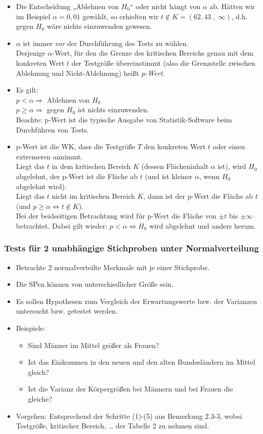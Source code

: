 \documentclass{scrreprt}
\begin{document}
\begin{itemize}
\item Die Entscheidung „Ablehnen von $H_0$“ oder nicht hängt von $\alpha$ ab. Hätten wir im Beispiel $\alpha = 0,01$ gewählt, so erhielten wir $t \not \in K = (62,43 \;,\; \infty)$, d.h. gegen $H_0$ wäre nichts einzuwenden gewesen.
\item $\alpha$ ist immer \emph{vor} der Durchführung des Tests zu wählen.\\
Derjenige $\alpha$-Wert, für den die Grenze des kritischen Bereichs genau mit dem konkreten Wert $t$ der Testgröße übereinstimmt (also die Grenzstelle zwischen Ablehnung und Nicht-Ablehnung) heißt \emph{p-Wert}.
\item Es gilt:\\
$p < \alpha \Rightarrow$ Ablehnen von $H_0$\\
$p \geq \alpha \Rightarrow$ gegen $H_0$ ist nichts einzuwenden.\\
Beachte: p-Wert ist die typische Ausgabe von Statistik-Software beim Durchführen von Tests.
\item p-Wert ist die WK, dass die Testgröße $T$ den konkreten Wert $t$ oder einen extremeren annimmt.\\
Liegt das $t$ in dem kritischen Bereich $K$ (dessen Flächeninhalt $\alpha$ ist), wird $H_0$ abgelehnt, der p-Wert ist die Fläche ab $t$ (und ist kleiner $\alpha$, wenn $H_0$ abgelehnt wird).\\
Liegt das $t$ nicht im kritischen Bereich $K$, dann ist der p-Wert die Fläche ab $t$ (und $p\geq \alpha \Leftrightarrow t \not \in K$).\\
Bei der beidseitigen Betrachtung wird für p-Wert die Fläche von $\pm t$ bis $\pm \infty$ betrachtet. Dabei gilt wieder: $p< \alpha \Leftrightarrow H_0$ wird abgelehnt und anders herum.
\end{itemize}

\subsubsection{Tests für 2 unabhängige Stichproben unter Normalverteilung}
\begin{itemize}
\item Betrachte 2 normalverteilte Merkmale mit je einer Stichprobe.
\item Die SPen können von unterschiedlicher Größe sein.
\item Es sollen Hypothesen zum Vergleich der Erwartungswerte bzw. der Varianzen untersucht bzw. getestet werden.
\item Beispiele:
\begin{itemize}
\item Sind Männer im Mittel größer als Frauen?
\item Ist das Einkommen in den neuen und den alten Bundesländern im Mittel gleich?
\item Ist die Varianz der Körpergrößen bei Männern und bei Frauen die gleiche?
\end{itemize}
\item Vorgehen: Entsprechend der Schritte (1)-(5) aus Bemerkung 2.3-3, wobei Testgröße, kritischer Bereich, … der Tabelle 2 zu nehmen sind. 
\end{itemize}
\end{document}
